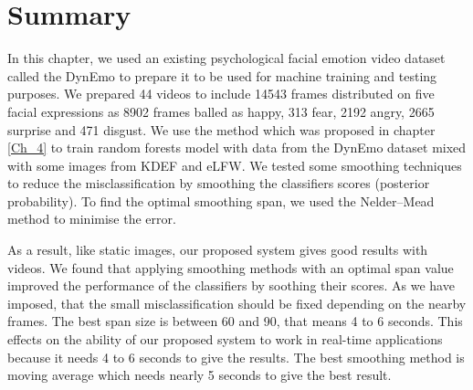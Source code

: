 %
%

\newpage

\section{Summary}
\label{sec:ch5_Summary}
In this chapter, we used an existing psychological facial emotion video dataset called the DynEmo to prepare it to be used for machine training and testing purposes. We prepared  44 videos to include 14543 frames distributed on five facial expressions as 8902 frames balled as happy, 313 fear, 2192 angry,  2665 surprise and  471 disgust. 
We use the method which was proposed in chapter \ref{Ch_4} to train random forests model with data from the DynEmo dataset mixed with some images from KDEF and eLFW. 
We tested some smoothing techniques to reduce the misclassification by smoothing the classifiers scores (posterior probability). To find the optimal smoothing span, we used the Nelder–Mead method to minimise the error.

As a result, like static images, our proposed system gives good results with videos. We found that applying smoothing methods with an optimal span value improved the performance of the classifiers by soothing their scores. As we have imposed, that the small misclassification should be fixed depending on the nearby frames.
The best span size is between 60 and 90, that means  4 to 6 seconds. This effects on the ability of our proposed system to work in real-time applications because it needs 4 to 6 seconds to give the results. The best smoothing method is moving average which needs nearly 5 seconds to give the best result.




